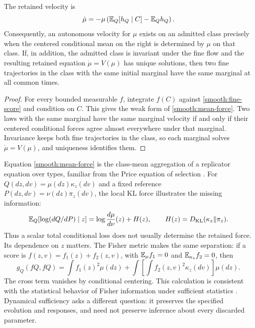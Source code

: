 The retained velocity is
\begin{equation}
 \dot\mu=-\mu\left(\mathbb E_Q[h_Q\mid C]-\mathbb E_Qh_Q\right).
 \label{smooth:mean-force}
\end{equation}
Consequently, an autonomous velocity for $\mu$ exists on an admitted class precisely when the centered conditional mean on the right is determined by $\mu$ on that class. If, in addition, the admitted class is invariant under the fine flow and the resulting retained equation $\dot\mu=V(\mu)$ has unique solutions, then two fine trajectories in the class with the same initial marginal have the same marginal at all common times.
\begin{proof}
For every bounded measurable $f$, integrate $f(C)$ against \cref{smooth:fine-score} and condition on $C$. This gives the weak form of \cref{smooth:mean-force}. Two laws with the same marginal have the same marginal velocity if and only if their centered conditional forces agree almost everywhere under that marginal. Invariance keeps both fine trajectories in the class, so each marginal solves $\dot\mu=V(\mu)$, and uniqueness identifies them.
\end{proof}

Equation \cref{smooth:mean-force} is the class-mean aggregation of a replicator equation over types, familiar from the Price equation of selection \citep{Price1970}. For $Q(dz,dv)=\mu(dz)\kappa_z(dv)$ and a fixed reference $P(dz,dv)=\nu(dz)\pi_z(dv)$, the local KL force illustrates the missing information:
\begin{equation}
 \mathbb E_Q[\log(dQ/dP)\mid z]
 =\log\frac{d\mu}{d\nu}(z)+H(z),\qquad
 H(z)=D_{\mathrm{KL}}(\kappa_z\Vert\pi_z).
 \label{smooth:hidden-profile}
\end{equation}
Thus a scalar total conditional loss does not usually determine the retained force. Its dependence on $z$ matters. The Fisher metric makes the same separation: if a score is $f(z,v)=f_1(z)+f_2(z,v)$, with $\mathbb E_\mu f_1=0$ and $\mathbb E_{\kappa_z}f_2=0$, then
\begin{equation}
 g_Q(fQ,fQ)=\int f_1(z)^2\mu(dz)
       +\int\left[\int f_2(z,v)^2\kappa_z(dv)\right]\mu(dz).
 \label{smooth:fisher-split}
\end{equation}
The cross term vanishes by conditional centering. This calculation is consistent with the statistical behavior of Fisher information under sufficient statistics \citep{AyJostLeSchwachhofer2015}. Dynamical sufficiency asks a different question: it preserves the specified evolution and responses, and need not preserve inference about every discarded parameter.


